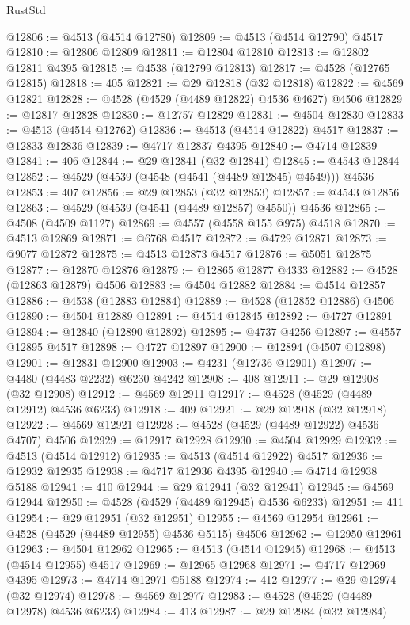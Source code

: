\begin{lexlean}{RustStd}
\begin{coremodule}
@12806 := @4513 (@4514 @12780)
@12809 := @4513 (@4514 @12790) @4517
@12810 := @12806 @12809
@12811 := @12804 @12810
@12813 := @12802 @12811 @4395
@12815 := @4538 (@12799 @12813)
@12817 := @4528 (@12765 @12815)
@12818 := 405
@12821 := @29 @12818 (@32 @12818)
@12822 := @4569 @12821
@12828 := @4528 (@4529 (@4489 @12822) @4536 @4627) @4506
@12829 := @12817 @12828
@12830 := @12757 @12829
@12831 := @4504 @12830
@12833 := @4513 (@4514 @12762)
@12836 := @4513 (@4514 @12822) @4517
@12837 := @12833 @12836
@12839 := @4717 @12837 @4395
@12840 := @4714 @12839
@12841 := 406
@12844 := @29 @12841 (@32 @12841)
@12845 := @4543 @12844
@12852 := @4529 (@4539 (@4548 (@4541 (@4489 @12845) @4549))) @4536
@12853 := 407
@12856 := @29 @12853 (@32 @12853)
@12857 := @4543 @12856
@12863 := @4529 (@4539 (@4541 (@4489 @12857) @4550)) @4536
@12865 := @4508 (@4509 @1127)
@12869 := @4557 (@4558 @155 @975) @4518
@12870 := @4513 @12869
@12871 := @6768 @4517
@12872 := @4729 @12871
@12873 := @9077 @12872
@12875 := @4513 @12873 @4517
@12876 := @5051 @12875
@12877 := @12870 @12876
@12879 := @12865 @12877 @4333
@12882 := @4528 (@12863 @12879) @4506
@12883 := @4504 @12882
@12884 := @4514 @12857
@12886 := @4538 (@12883 @12884)
@12889 := @4528 (@12852 @12886) @4506
@12890 := @4504 @12889
@12891 := @4514 @12845
@12892 := @4727 @12891
@12894 := @12840 (@12890 @12892)
@12895 := @4737 @4256
@12897 := @4557 @12895 @4517
@12898 := @4727 @12897
@12900 := @12894 (@4507 @12898)
@12901 := @12831 @12900
@12903 := @4231 (@12736 @12901)
@12907 := @4480 (@4483 @2232) @6230 @4242
@12908 := 408
@12911 := @29 @12908 (@32 @12908)
@12912 := @4569 @12911
@12917 := @4528 (@4529 (@4489 @12912) @4536 @6233)
@12918 := 409
@12921 := @29 @12918 (@32 @12918)
@12922 := @4569 @12921
@12928 := @4528 (@4529 (@4489 @12922) @4536 @4707) @4506
@12929 := @12917 @12928
@12930 := @4504 @12929
@12932 := @4513 (@4514 @12912)
@12935 := @4513 (@4514 @12922) @4517
@12936 := @12932 @12935
@12938 := @4717 @12936 @4395
@12940 := @4714 @12938 @5188
@12941 := 410
@12944 := @29 @12941 (@32 @12941)
@12945 := @4569 @12944
@12950 := @4528 (@4529 (@4489 @12945) @4536 @6233)
@12951 := 411
@12954 := @29 @12951 (@32 @12951)
@12955 := @4569 @12954
@12961 := @4528 (@4529 (@4489 @12955) @4536 @5115) @4506
@12962 := @12950 @12961
@12963 := @4504 @12962
@12965 := @4513 (@4514 @12945)
@12968 := @4513 (@4514 @12955) @4517
@12969 := @12965 @12968
@12971 := @4717 @12969 @4395
@12973 := @4714 @12971 @5188
@12974 := 412
@12977 := @29 @12974 (@32 @12974)
@12978 := @4569 @12977
@12983 := @4528 (@4529 (@4489 @12978) @4536 @6233)
@12984 := 413
@12987 := @29 @12984 (@32 @12984)

\end{coremodule}
\end{lexlean}
